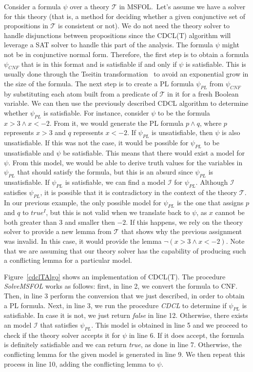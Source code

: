 Consider a formula $\psi$ over a theory $\mathcal{T}$ in MSFOL.\ Let's assume we have a solver for this theory (that is, a method for deciding
whether a given conjunctive set of propositions in $\mathcal{T}$ is consistent or not). We do not need the theory solver to handle disjunctions
between propositions since the CDCL(T) algorithm will leverage a SAT solver to handle this part of the analysis.
%
The formula $\psi$ might not be in conjunctive normal form. Therefore, the first step is to obtain a formula $\psi_{CNF}$ that is in this format and
is satisfiable if and only if $\psi$ is satisfiable. This is usually done through the Tseitin transformation~\cite{tseitin} to avoid an exponential
grow in the size of the formula.
The next step is to create a PL formula $\psi_{PL}$ from $\psi_{CNF}$ by substituting each atom built from a predicate of $\mathcal{T}$ in it for a fresh Boolean variable. We can then use the previously described CDCL algorithm to determine whether $\psi_{PL}$ is satisfiable. For instance, consider $\psi$ to be the formula $x > 3 \wedge x < -2$. From it, we would generate the PL formula $p \wedge q$, where $p$ represents $x > 3$ and $q$ represents $x < -2$. If $\psi_{PL}$ is unsatisfiable, then $\psi$ is also unsatisfiable. If this was not the case, it would be possible for $\psi_{PL}$ to be unsatisfiable and $\psi$ be satisfiable. This means that there would exist a model for $\psi$. From this model, we would be able to derive truth values for the variables in $\psi_{PL}$ that should satisfy the formula, but this is an absurd since $\psi_{PL}$ is unsatisfiable.
If $\psi_{PL}$ is satisfiable, we can find a model $\mathcal{I}$ for $\psi_{PL}$. Although $\mathcal{I}$ satisfies $\psi_{PL}$, it is possible that it is contradictory in the context of the theory $\mathcal{T}$. In our previous example,
the only possible model for $\psi_{PL}$ is the one that assigns $p$ and $q$ to $true^{I}$, but this is not valid when we translate back to $\psi$, as $x$ cannot be both greater than $3$ and smaller then $-2$.
 If this happens, we rely on the theory solver to provide a new lemma from $\mathcal{T}$ that shows why the previous assignment was invalid. In this case, it would provide the lemma $\neg (x > 3 \wedge x < -2)$. Note that we are assuming that our theory solver has the capability of producing such a conflicting lemma for a particular model.

Figure~\ref{cdclTAlgo} shows an implementation of CDCL(T). The procedure \textit{SolveMSFOL} works as follows: first, in line 2, we convert the formula to CNF. Then, in line 3 perform the conversion that we just described, in order to obtain a PL formula. Next, in line 3, we run the procedure \textit{CDCL} to determine if $\psi_{PL}$ is satisfiable. In case it is not, we just return \textit{false} in line 12. Otherwise, there exists an model $\mathcal{I}$ that satisfies $\psi_{PL}$. This model is obtained in line 5 and we proceed to check if the theory solver accepts it for $\psi$ in line 6. If it does accept, the formula is definitely satisfiable and we can return \textit{true}, as done in line 7. Otherwise, the conflicting lemma for the given model is generated in line 9. We then repeat this process in line 10, adding the conflicting lemma to $\psi$.

